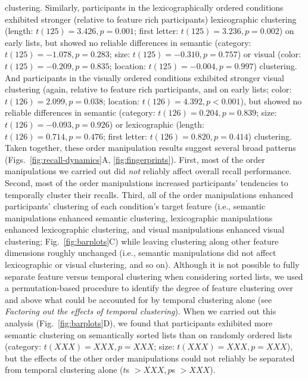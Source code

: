 \documentclass[11pt]{article}
\begin{document}
clustering. Similarly, participants in the lexicographically ordered conditions
exhibited stronger (relative to feature rich participants) lexicographic
clustering (length: $t(125) = 3.426, p = 0.001$; first letter: $t(125) = 3.236,
p = 0.002$) on early lists, but showed no reliable differences in semantic
(category: $t(125) = -1.078, p = 0.283$; size: $t(125) = -0.310, p = 0.757$) or
visual (color: $t(125) = -0.209, p = 0.835$; location: $t(125) = -0.004, p =
0.997$) clustering. And participants in the visually ordered conditions
exhibited stronger visual clustering (again, relative to feature rich
participants, and on early lists; color: $t(126) = 2.099, p = 0.038$; location:
$t(126) = 4.392, p < 0.001$), but showed no reliable differences in semantic
(category: $t(126) = 0.204, p = 0.839$; size: $t(126) = -0.093, p = 0.926$) or
lexicographic (length: $t(126) = 0.714, p = 0.476$; first letter: $t(126) =
0.820, p = 0.414$) clustering. Taken together, these order manipulation results
suggest several broad patterns (Figs.~\ref{fig:recall-dynamics}A,
\ref{fig:fingerprints}). First, most of the order manipulations we carried out
did \textit{not} reliably affect overall recall performance. Second, most of
the order manipulations increased participants' tendencies to temporally
cluster their recalls. Third, all of the order manipulations enhanced
participants' clustering of each condition's target feature (i.e., semantic
manipulations enhanced semantic clustering, lexicographic manipulations
enhanced lexicographic clustering, and visual manipulations enhanced visual
clustering; Fig.~\ref{fig:barplots}C) while leaving clustering along other
feature dimensions roughly unchanged (i.e., semantic manipulations did not
affect lexicographic or visual clustering, and so on). Although it is not
possible to fully separate feature versus temporal clustering when considering
sorted lists, we used a permutation-based procedure to identify the degree of
feature clustering over and above what could be accounted for by temporal
clustering alone (see \textit{Factoring out the effects of temporal
clustering}). When we carried out this analysis (Fig.~\ref{fig:barplots}D), we
found that participants exhibited more semantic clustering on semantically
sorted lists than on randomly ordered lists (category: $t(XXX) = XXX, p = XXX$;
size: $t(XXX) = XXX, p = XXX$), but the effects of the other order
manipulations could not reliably be separated from temporal clustering alone
($t$s $> XXX, p$s $> XXX$).
\end{document}

